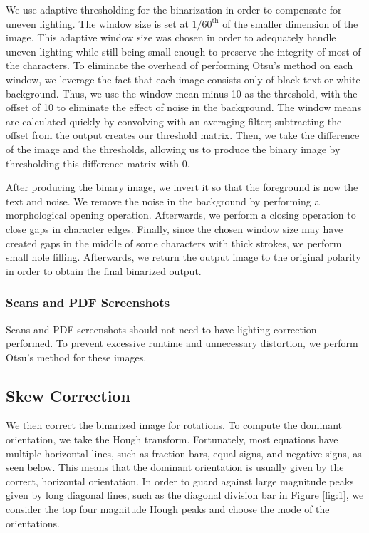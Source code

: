 \documentclass[journal]{IEEEtran}
\begin{document}
We use adaptive thresholding for the binarization in order to compensate for uneven lighting. The window size is set at $1/60^{\text{th}}$ of the smaller dimension of the image. This adaptive window size was chosen in order to adequately handle uneven lighting while still being small enough to preserve the integrity of most of the characters. To eliminate the overhead of performing Otsu’s method on each window, we leverage the fact that each image consists only of black text or white background. Thus, we use the window mean minus 10 as the threshold, with the offset of 10 to eliminate the effect of noise in the background. The window means are calculated quickly by convolving with an averaging filter; subtracting the offset from the output creates our threshold matrix. Then, we take the difference of the image and the thresholds, allowing us to produce the binary image by thresholding this difference matrix with $0$.

After producing the binary image, we invert it so that the foreground is now the text and noise. We remove the noise in the background by performing a morphological opening operation. Afterwards, we perform a closing operation to close gaps in character edges. Finally, since the chosen window size may have created gaps in the middle of some characters with thick strokes, we perform small hole filling. Afterwards, we return the output image to the original polarity in order to obtain the final binarized output.

\subsubsection{Scans and PDF Screenshots}
 Scans and PDF screenshots should not need to have lighting correction performed. To prevent excessive runtime and unnecessary distortion, we perform Otsu’s method for these images.
 
 \subsection{Skew Correction}
 We then correct the binarized image for rotations. To compute the dominant orientation, we take the Hough transform. Fortunately, most equations have multiple horizontal lines, such as fraction bars, equal signs, and negative signs, as seen below. This means that the dominant orientation is usually given by the correct, horizontal orientation. In order to guard against large magnitude peaks given by long diagonal lines, such as the diagonal division bar in Figure \ref{fig:1}, we consider the top four magnitude Hough peaks and choose the mode of the orientations. 
 
\end{document}
